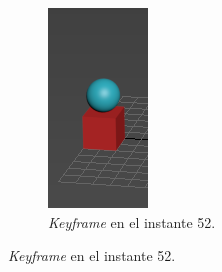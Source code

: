 \documentclass{article}
\begin{document}
\begin{figure}[H]
\begin{subfigure}[H]{0.15\textwidth}
	\end{subfigure}
    \hfill
	\begin{subfigure}[H]{0.15\textwidth}
	    \centering
	    \includegraphics[width=\textwidth]{imagenes/Ejercicio 1/p1_ins15_short.png}
	    \caption{\textit{Keyframe} en el instante 52.}
	\end{subfigure}
\end{figure}
\end{document}
